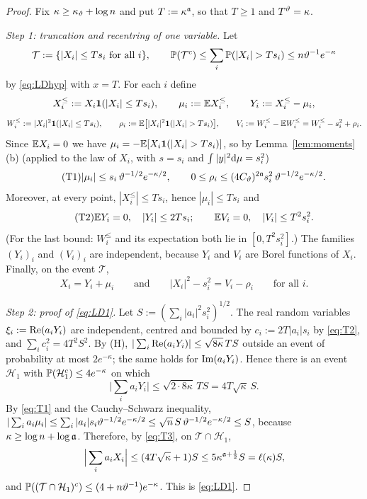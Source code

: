 \begin{proof}
Fix $\kappa\ge\kappa_\vartheta+\log n$ and put $T:=\kappa^{\mathfrak{a}}$, so that $T\ge1$ and $T^\vartheta=\kappa$.

\emph{Step 1: truncation and recentring of one variable.} Let
\[
 \mathcal T:=\{|X_i|\le Ts_i\ \text{for all }i\},\qquad\PP(\mathcal T^c)\le\sum_i\PP(|X_i|>Ts_i)\le n\vth^{-1}e^{-\kappa}
\]
by \eqref{eq:LDhyp} with $x=T$. For each $i$ define
\[
 X_i^\le:=X_i\mathbf{1}(|X_i|\le Ts_i),\qquad\mu_i:=\mathbb{E} X_i^\le,\qquad Y_i:=X_i^\le-\mu_i,
\]
\[
 W_i^\le:=|X_i|^2\bone(|X_i|\le Ts_i),\qquad\rho_i:=\EE\big[|X_i|^2\bone(|X_i|>Ts_i)\big],\qquad V_i:=W_i^\le-\EE W_i^\le=W_i^\le-s_i^2+\rho_i .
\]
Since $\mathbb{E} X_i=0$ we have $\mu_i=-\EE[X_i\bone(|X_i|>Ts_i)]$, so by Lemma~\ref{lem:moments}(b) (applied to the law of $X_i$, with $s=s_i$ and $\int|y|^2\mathrm{d}\mu=s_i^2$)
\begin{equation}\tag{T1}\label{eq:T1}
 |\mu_i|\le s_i\,\vartheta^{-1/2}e^{-\kappa/2},\qquad0\le\rho_i\le(4C_\vartheta)^{2\mathfrak{a}}s_i^2\,\vartheta^{-1/2}e^{-\kappa/2}.
\end{equation}
Moreover, at every point, $|X_i^\le|\le Ts_i$, hence $|\mu_i|\le Ts_i$ and
\begin{equation}\tag{T2}\label{eq:T2}
 \mathbb{E} Y_i=0,\quad|Y_i|\le2Ts_i;\qquad\mathbb{E} V_i=0,\quad|V_i|\le T^2s_i^2 .
\end{equation}
(For the last bound: $W_i^\le$ and its expectation both lie in $[0,T^2s_i^2]$.) The families $(Y_i)_i$ and $(V_i)_i$ are independent, because $Y_i$ and $V_i$ are Borel functions of $X_i$. Finally, on the event $\mathcal T$,
\begin{equation}\tag{T3}\label{eq:T3}
 X_i=Y_i+\mu_i\qquad\text{and}\qquad|X_i|^2-s_i^2=V_i-\rho_i\qquad\text{for all }i .
\end{equation}

\emph{Step 2: proof of \eqref{eq:LD1}.} Let $S:=(\sum_i|a_i|^2s_i^2)^{1/2}$. The real random variables $\xi_i:=\operatorname{Re}(a_iY_i)$ are independent, centred and bounded by $c_i:=2T|a_i|s_i$ by \eqref{eq:T2}, and $\sum_ic_i^2=4T^2S^2$.
By (H), $|\sum_i\operatorname{Re}(a_iY_i)|\le\sqrt{8\kappa}\,TS$ outside an event of probability at most $2e^{-\kappa}$; the same holds for $\operatorname{Im}(a_iY_i)$. Hence there is an event $\mathcal H_1$ with $\mathbb{P}(\mathcal H_1^c)\le4e^{-\kappa}$ on which
\[
 \Big|\sum_ia_iY_i\Big|\le\sqrt{2\cdot8\kappa}\,TS=4T\sqrt\kappa\,S .
\]
By \eqref{eq:T1} and the Cauchy--Schwarz inequality, $|\sum_ia_i\mu_i|\le\sum_i|a_i|s_i\vartheta^{-1/2}e^{-\kappa/2}\le\sqrt n\,S\,\vartheta^{-1/2}e^{-\kappa/2}\le S$, because $\kappa\ge\log n+\log\mathfrak{a}$.
Therefore, by \eqref{eq:T3}, on $\mathcal T\cap\mathcal H_1$,
\[
 \Big|\sum_ia_iX_i\Big|\le(4T\sqrt\kappa+1)S\le5\kappa^{\mathfrak{a}+\frac12}S=\ell(\kappa)S,
\]
and $\mathbb{P}((\mathcal T\cap\mathcal H_1)^c)\le(4+n\vartheta^{-1})e^{-\kappa}$. This is \eqref{eq:LD1}.


\end{proof}
